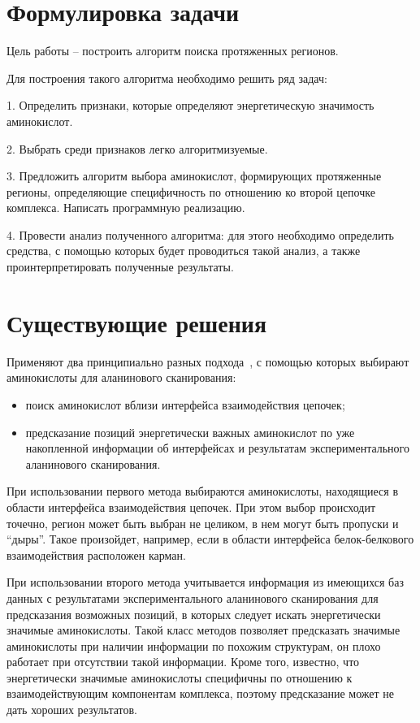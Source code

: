 \section{Формулировка задачи}
Цель работы -- построить алгоритм поиска протяженных регионов.

Для построения такого алгоритма необходимо решить ряд задач:

1. Определить признаки, которые определяют энергетическую значимость аминокислот.

2. Выбрать среди признаков легко алгоритмизуемые.

3. Предложить алгоритм выбора аминокислот, формирующих протяженные регионы, определяющие специфичность по отношению ко второй цепочке комплекса. Написать программную реализацию.

4. Провести анализ полученного алгоритма: для этого необходимо определить средства, с помощью которых будет проводиться такой анализ, а также проинтерпретировать полученные результаты.
\section{Существующие решения}
Применяют два принципиально разных подхода~\cite{hotspots2012rev}, с помощью которых выбирают аминокислоты для аланинового сканирования: 
\begin{itemize}
\item поиск аминокислот вблизи интерфейса взаимодействия цепочек;
\item предсказание позиций энергетически важных аминокислот по уже накопленной информации об интерфейсах и результатам экспериментального аланинового сканирования.
\end{itemize}


При использовании первого метода выбираются аминокислоты, находящиеся в области интерфейса взаимодействия цепочек. При этом выбор происходит точечно, регион может быть выбран не целиком, в нем могут быть пропуски и “дыры”. Такое произойдет, например, если в области интерфейса белок-белкового взаимодействия расположен карман.

При использовании второго метода учитывается информация из имеющихся баз данных с результатами экспериментального аланинового сканирования для предсказания возможных позиций, в которых следует искать энергетически значимые аминокислоты. Такой класс методов позволяет предсказать значимые аминокислоты при наличии информации по похожим структурам, он плохо работает при отсутствии такой информации. Кроме того, известно, что энергетически значимые аминокислоты специфичны по отношению к взаимодействующим компонентам комплекса, поэтому предсказание может не дать хороших результатов.

